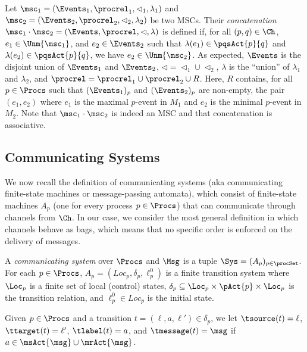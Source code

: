 Let $\msc_1 = (\Events_1,\procrel_1,\lhd_1,\lambda_1)$ and
$\msc_2 = (\Events_2,\procrel_2,\lhd_2,\lambda_2)$ be two MSCs.
Their \emph{concatenation} $\msc_1 \cdot \msc_2 = (\Events,\procrel,\lhd,\lambda)$ is defined if, for all $(p,q) \in \Ch$,
$e_1 \in \Unm{\msc_1}$, and
$e_2 \in \Events_2$ such that $\lambda(e_1) \in \pqsAct{p}{q}$
and $\lambda(e_2) \in \pqsAct{p}{q}$,
we have $e_2 \in \Unm{\msc_2}$.
As expected, $\Events$ is the disjoint union of $\Events_1$ and $\Events_2$,
${\lhd}  = {\lhd_1} \cup {\lhd_2}$, $\lambda$ is the ``union'' of $\lambda_1$
and $\lambda_2$, and ${\procrel} = {\procrel_1} \cup {\procrel_2} \cup R$.
Here, $R$ contains, for all $p \in \Procs$ such that $(\Events_1)_p$ and
$(\Events_2)_p$ are non-empty, the pair $(e_1,e_2)$ where $e_1$ is the
maximal $p$-event in $M_1$ and $e_2$ is the minimal $p$-event in $M_2$.
Note that $\msc_1 \cdot \msc_2$ is indeed an MSC and that
concatenation is associative.



\subsection{Communicating Systems}

We now recall the definition of communicating systems (aka communicating finite-state
machines or message-passing automata), which consist of finite-state machines $A_p$
(one for every process $p \in \Procs$) that can communicate through channels from $\Ch$. In our case, we consider the most general definition in which channels behave as bags, which means that no specific order is enforced on the delivery of messages.

\begin{definition}\label{def:cs}
A \emph{communicating system} over $\Procs$ and $\Msg$ is a tuple
   $ \Sys = (A_p)_{p\in\procSet}$. For each
   $p \in \Procs$, $A_p = (Loc_p, \delta_p, \ell^0_p)$ is a finite transition system where
   $\Loc_p$ is a finite set of local (control) states, $\delta_p
   \subseteq \Loc_p \times \pAct{p} \times \Loc_p$ is the
   transition relation, and $\ell^0_p \in Loc_p$ is the initial state.
\end{definition}

Given $p \in \Procs$ and a transition $t = (\ell,a,\ell') \in \delta_p$, we let
$\tsource(t) = \ell$, $\ttarget(t) = \ell'$, $\tlabel(t) = a$, and
$\tmessage(t) = \msg$ if $a \in \msAct{\msg} \cup \mrAct{\msg}$.

\smallskip

